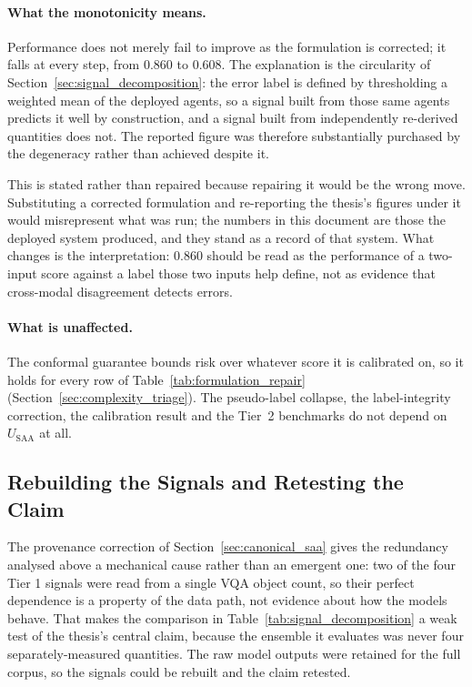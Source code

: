 \documentclass[12pt,a4paper]{report}
\begin{document}
\paragraph{What the monotonicity means.} Performance does not merely fail to improve as the
formulation is corrected; it falls at every step, from $0.860$ to $0.608$. The explanation is the
circularity of Section~\ref{sec:signal_decomposition}: the error label is defined by thresholding a
weighted mean of the deployed agents, so a signal built from those same agents predicts it well by
construction, and a signal built from independently re-derived quantities does not. The reported
figure was therefore substantially purchased by the degeneracy rather than achieved despite it.

This is stated rather than repaired because repairing it would be the wrong move. Substituting a
corrected formulation and re-reporting the thesis's figures under it would misrepresent what was
run; the numbers in this document are those the deployed system produced, and they stand as a
record of that system. What changes is the interpretation: $0.860$ should be read as the
performance of a two-input score against a label those two inputs help define, not as evidence
that cross-modal disagreement detects errors.

\paragraph{What is unaffected.} The conformal guarantee bounds risk over whatever score it is
calibrated on, so it holds for every row of Table~\ref{tab:formulation_repair}
(Section~\ref{sec:complexity_triage}). The pseudo-label collapse, the label-integrity correction,
the calibration result and the Tier~2 benchmarks do not depend on $U_{\text{SAA}}$ at all.

\subsection{Rebuilding the Signals and Retesting the Claim}
\label{sec:signal_rebuild}
The provenance correction of Section~\ref{sec:canonical_saa} gives the redundancy analysed above a mechanical cause rather than an emergent one: two of the four Tier 1 signals were read from a single VQA object count, so their perfect dependence is a property of the data path, not evidence about how the models behave. That makes the comparison in Table~\ref{tab:signal_decomposition} a weak test of the thesis's central claim, because the ensemble it evaluates was never four separately-measured quantities. The raw model outputs were retained for the full corpus, so the signals could be rebuilt and the claim retested.
\end{document}
